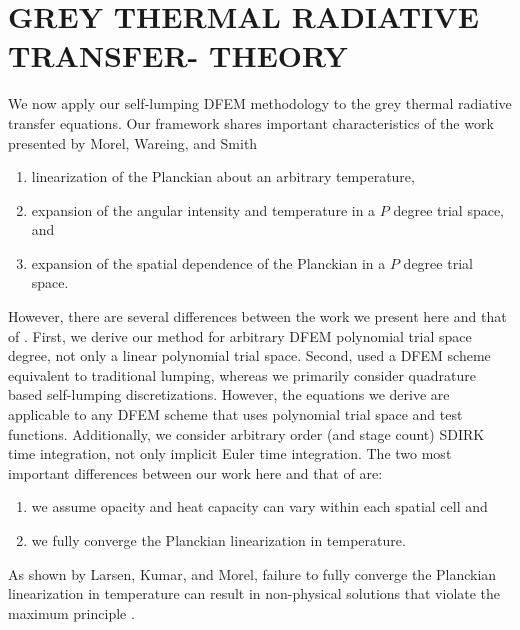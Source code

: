 %
%
%



\chapter{\uppercase{Grey Thermal Radiative Transfer- Theory}}
\label{sec:chapter6_grey_radtran}

We now apply our self-lumping DFEM methodology to the grey thermal radiative transfer equations.
Our framework shares important characteristics of the work presented by Morel, Wareing, and Smith \cite{morel_radtran}
\begin{enumerate}
\item linearization of the Planckian about an arbitrary temperature,
\item  expansion of the angular intensity and temperature in a $P$ degree trial space, and
\item expansion of the spatial dependence of the Planckian in a $P$ degree trial space.
\end{enumerate}
However, there are several differences between the work we present here and that of \cite{morel_radtran}.
First, we derive our method for arbitrary DFEM polynomial trial space degree, not only a linear polynomial trial space.
Second, \cite{morel_radtran} used a DFEM scheme equivalent to traditional lumping, whereas we primarily consider quadrature based self-lumping discretizations.
However, the equations we derive are applicable to any DFEM scheme that uses polynomial trial space and test functions.
Additionally, we consider arbitrary order (and stage count) SDIRK time integration, not only implicit Euler time integration.
The two most important differences between our work here and that of \cite{morel_radtran} are:
\begin{enumerate}
\item we assume opacity and heat capacity can vary within each spatial cell and
\item we fully converge the Planckian linearization in temperature.
\end{enumerate}
As shown by Larsen, Kumar, and Morel, failure to fully converge the Planckian linearization in temperature can result in non-physical solutions that violate the maximum principle \cite{larsen_trt}.

